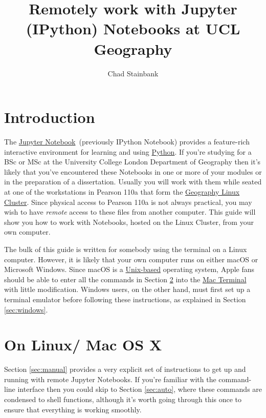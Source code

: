 \documentclass[a4paper]{article}
\title{Remotely work with Jupyter (IPython) Notebooks at UCL Geography}
\author{Chad Stainbank}
\begin{document}
\maketitle
\section{Introduction}
\label{sec:intro}
The \href{http://jupyter.org/}{Jupyter Notebook}~(previously IPython Notebook) provides a feature-rich interactive environment for learning and using \href{https://www.python.org/}{Python}.
If you're studying for a BSc or MSc at the University College London Department of Geography then it's likely that you've encountered these Notebooks in one or more of your modules or in the preparation of a dissertation.
Usually you will work with them while seated at one of the workstations in Pearson 110a that form the \href{http://www.geog.ucl.ac.uk/resources/computer-support/teaching-cluster}{Geography Linux Cluster}.
Since physical access to Pearson 110a is not always practical, you may wish to have \emph{remote} access to these files from another computer.
This guide will show you how to work with Notebooks, hosted on the Linux Cluster, from your own computer. 

The bulk of this guide is written for somebody using the terminal on a Linux computer.
However, it is likely that your own computer runs on either macOS or Microsoft Windows.
Since macOS is a \href{http://unix.stackexchange.com/questions/1489/is-mac-os-x-unix}{Unix-based} operating system, Apple fans should be able to enter all the commands in Section \ref{sec:linuxmac} into the \href{http://www.macworld.co.uk/feature/mac-software/get-more-out-of-os-x-terminal-3608274/}{Mac Terminal} with little modification.
Windows users, on the other hand, must first set up a terminal emulator before following these instructions, as explained in Section \ref{sec:windows}.

\section{On Linux/ Mac OS X}
\label{sec:linuxmac}
Section \ref{sec:manual} provides a very explicit set of instructions to get up and running with remote Jupyter Notebooks.
If you're familiar with the command-line interface then you could skip to Section \ref{sec:auto}, where these commands are condensed to shell functions, although it's worth going through this once to ensure that everything is working smoothly.
\end{document}
